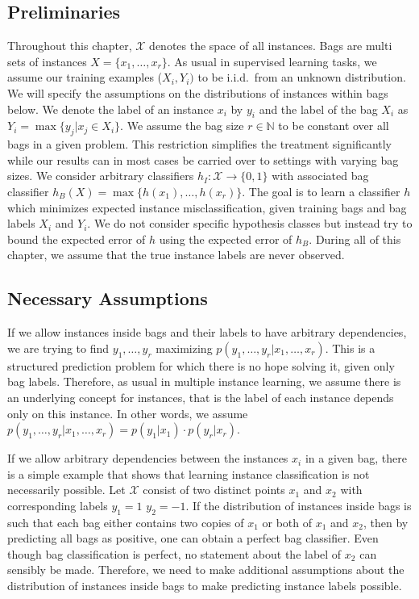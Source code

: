\subsection{Preliminaries}
Throughout this chapter, $\mathcal{X}$ denotes the space of all instances. Bags
are multi sets of instances $X=\{x_1,\dotsc, x_r\}$.  As usual in supervised
learning tasks, we assume our training examples ($X_i,Y_i)$ to be i.i.d.\ from
an unknown distribution. We will specify the assumptions on the distributions
of instances within bags below. We denote the label of an instance $x_i$ by $y_i$ and
the label of the bag $X_i$ as $Y_i = \max\{y_j | x_j \in  X_i\}$.  We assume
the bag size $r\in \mathbb{N}$ to be constant over all bags in a given problem.
This restriction simplifies the treatment significantly while our results can
in most cases be carried over to settings with varying bag sizes.  We consider
arbitrary classifiers $h_I\colon \mathcal{X} \rightarrow \{0, 1\}$ with
associated bag classifier $h_B(X) = \max \{h(x_1),\dotsc,h(x_r)\}$.  The goal
is to learn a classifier $h$ which minimizes expected instance
misclassification, given training bags and bag labels $X_i$ and $Y_i$.  We do
not consider specific hypothesis classes but instead try to bound the expected
error of $h$ using the expected error of $h_B$.  During all of this chapter, we
assume that the true instance labels are never observed.

\subsection{Necessary Assumptions}
If we allow instances inside bags and their labels to have arbitrary
dependencies, we are trying to find $y_1,\dotsc,y_r$ maximizing $p(y_1,\dotsc,
y_r | x_1, \dotsc, x_r)$. This is a structured prediction problem for which
there is no hope solving it, given only bag labels. Therefore, as usual in
multiple instance learning, we assume there is an underlying concept for
instances, that is the label of each instance depends only on this instance.
In other words, we assume $p(y_1,\dotsc, y_r | x_1, \dotsc, x_r)=p(y_1|x_1)
\cdot p(y_r|x_r)$.

If we allow arbitrary dependencies between the instances $x_i$ in a given bag,
there is a simple example \citep{sabato2009homogeneous} that shows that
learning instance classification is not necessarily possible. Let
$\mathcal{X}$ consist of two distinct points $x_1$ and $x_2$ with corresponding
labels $y_1 = 1$ $y_2 = -1$. If the distribution of instances inside bags is
such that each bag either contains two copies of $x_1$ or both of $x_1$ and
$x_2$, then by predicting all bags as positive, one can obtain a perfect bag
classifier. Even though bag classification is perfect, no statement about the
label of $x_2$ can sensibly be made.
Therefore, we need to make additional assumptions about the distribution of
instances inside bags to make predicting instance labels possible.


